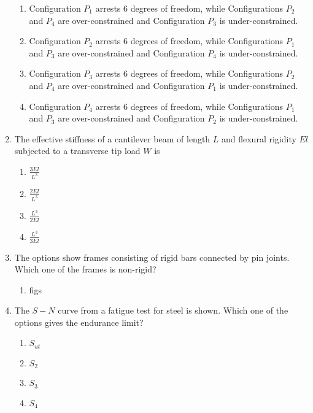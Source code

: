\documentclass[journal]{IEEEtran}
\numberwithin{equation}{enumi}
\numberwithin{figure}{enumi}
\begin{document}
\begin{enumerate}
    \begin{enumerate}
        \item Configuration $P_1$ arrests 6 degrees of freedom, while Configurations $P_2$ and $P_4$ are over-constrained and Configuration $P_3$ is under-constrained.
        \item Configuration $P_2$ arrests 6 degrees of freedom, while Configurations $P_1$ and $P_3$ are over-constrained and Configuration $P_4$ is under-constrained.
        \item Configuration $P_3$ arrests 6 degrees of freedom, while Configurations $P_2$ and $P_4$ are over-constrained and Configuration $P_1$ is under-constrained.
        \item Configuration $P_4$ arrests 6 degrees of freedom, while Configurations $P_1$ and $P_3$ are over-constrained and Configuration $P_2$ is under-constrained.
    \end{enumerate}

    \item 
    The effective stiffness of a cantilever beam of length $L$ and flexural rigidity $El$ subjected to a transverse tip load $W$ is

        
    \begin{enumerate}
        \item $\frac{3El}{L^3}$
        \item $\frac{2El}{L^3}$
        \item $\frac{L^3}{2El}$
        \item $\frac{L^3}{3El}$
    \end{enumerate}
    
    \item 
    The options show frames consisting of rigid bars connected by pin joints. Which one of the frames is non-rigid?
    \begin{enumerate}
        \item figs
    \end{enumerate}

    \item 
    The $S-N$ curve from a fatigue test for steel is shown. Which one of the options gives the endurance limit?


    \begin{enumerate}
        \item $S_{ut}$
        \item $S_{2}$
        \item $S_{3}$
        \item $S_{4}$
    \end{enumerate}


\end{enumerate}
\end{document}
